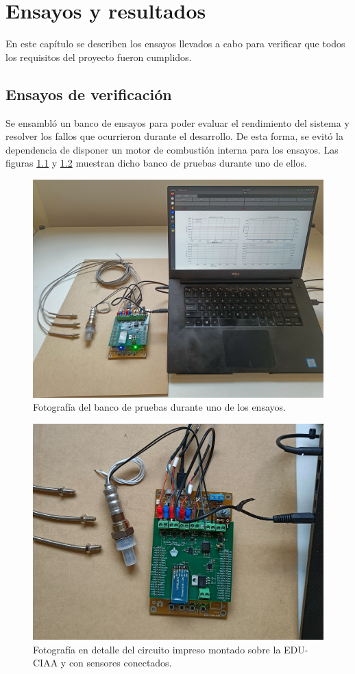 \chapter{Ensayos y resultados}

\label{Chapter4}

En este capítulo se describen los ensayos llevados a cabo para verificar que todos los requisitos del proyecto fueron cumplidos.

\section{Ensayos de verificación}

Se ensambló un banco de ensayos para poder evaluar el rendimiento del sistema y resolver los fallos que ocurrieron durante el desarrollo. De esta forma, se evitó la dependencia de disponer un motor de combustión interna para los ensayos. Las figuras \ref{fig:banco-pruebas-1} y \ref{fig:banco-pruebas-2} muestran dicho banco de pruebas durante uno de ellos.

\begin{figure}[htpb]
\centering
\includegraphics[width=.85\textwidth]{./Figures/banco-pruebas-1.jpg}
\caption{Fotografía del banco de pruebas durante uno de los ensayos.}
\label{fig:banco-pruebas-1}
\end{figure}

\begin{figure}[htpb]
\centering
\includegraphics[width=.85\textwidth]{./Figures/banco-pruebas-2.jpg}
\caption{Fotografía en detalle del circuito impreso montado sobre la EDU-CIAA y con sensores conectados.}
\label{fig:banco-pruebas-2}
\end{figure}
\break
